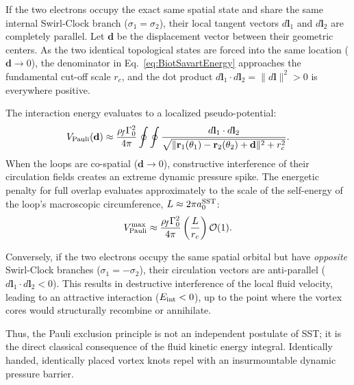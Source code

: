 \documentclass[11pt,a4paper]{article}
\begin{document}
If the two electrons occupy the exact same spatial state and share the same internal Swirl-Clock branch ($\sigma_1 = \sigma_2$), their local tangent vectors $d\mathbf{l}_1$ and $d\mathbf{l}_2$ are completely parallel. Let $\mathbf{d}$ be the displacement vector between their geometric centers. As the two identical topological states are forced into the same location ($\mathbf{d} \to 0$), the denominator in Eq.~\eqref{eq:BiotSavartEnergy} approaches the fundamental cut-off scale $r_c$, and the dot product $d\mathbf{l}_1 \cdot d\mathbf{l}_2 = \lVert d\mathbf{l} \rVert^2 > 0$ is everywhere positive.

The interaction energy evaluates to a localized pseudo-potential:
\begin{equation}
\label{eq:VPauli}
V_{\rm Pauli}(\mathbf{d}) \approx \frac{\rho_{\!f} \Gamma_0^2}{4\pi} \oint \oint \frac{d\mathbf{l}_1 \cdot d\mathbf{l}_2}{\sqrt{\lVert \mathbf{r}_1(\theta_1) - \mathbf{r}_2(\theta_2) + \mathbf{d} \rVert^2 + r_c^2}}.
\end{equation}
When the loops are co-spatial ($\mathbf{d} \to 0$), constructive interference of their circulation fields creates an extreme dynamic pressure spike. The energetic penalty for full overlap evaluates approximately to the scale of the self-energy of the loop's macroscopic circumference, $L \approx 2\pi a_0^{\rm SST}$:
\begin{equation}
\label{eq:VPauli_Max}
V_{\rm Pauli}^{\rm max} \approx \frac{\rho_{\!f} \Gamma_0^2}{4\pi} \left( \frac{L}{r_c} \right) \mathcal{O}(1).
\end{equation}

Conversely, if the two electrons occupy the same spatial orbital but have \emph{opposite} Swirl-Clock branches ($\sigma_1 = -\sigma_2$), their circulation vectors are anti-parallel ($d\mathbf{l}_1 \cdot d\mathbf{l}_2 < 0$). This results in destructive interference of the local fluid velocity, leading to an attractive interaction ($E_{\rm int} < 0$), up to the point where the vortex cores would structurally recombine or annihilate.

Thus, the Pauli exclusion principle is not an independent postulate of SST; it is the direct classical consequence of the fluid kinetic energy integral. Identically handed, identically placed vortex knots repel with an insurmountable dynamic pressure barrier.
\end{document}
